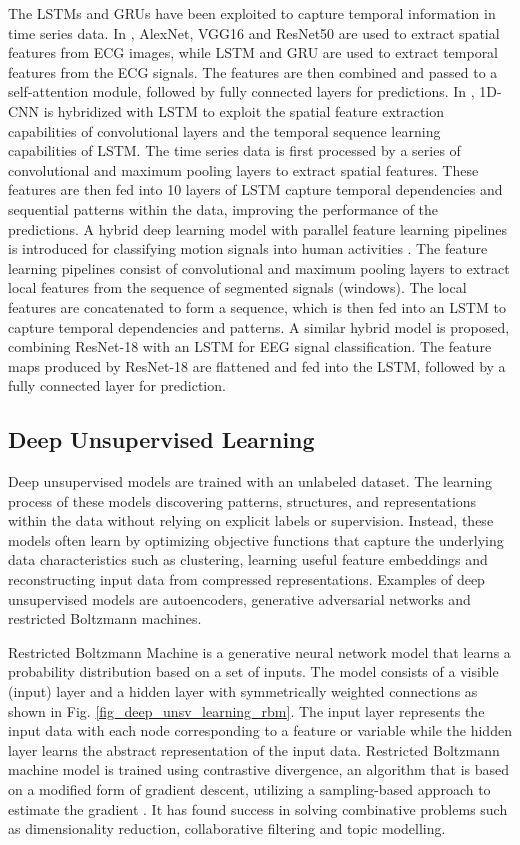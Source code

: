 \documentclass[preprint,12pt]{elsarticle}
\begin{document}
The LSTMs and GRUs have been exploited to capture temporal information in time series data. In \citep{narotamo_deep_2024}, AlexNet, VGG16 and ResNet50 are used to extract spatial features from ECG images, while LSTM and GRU are used to extract temporal features from the ECG signals. The features are then combined and passed to a self-attention module, followed by fully connected layers for predictions. In \citep{zhang_heart_2024}, 1D-CNN is hybridized with LSTM to exploit the spatial feature extraction capabilities of convolutional layers and the temporal sequence learning capabilities of LSTM. The time series data is first processed by a series of convolutional and maximum pooling layers to extract spatial features. These features are then fed into 10 layers of LSTM capture temporal dependencies and sequential patterns within the data, improving the performance of the predictions. A hybrid deep learning model with parallel feature learning pipelines is introduced for classifying motion signals into human activities \citep{mohd_noor_deep_2022}. The feature learning pipelines consist of convolutional and maximum pooling layers to extract local features from the sequence of segmented signals (windows). The local features are concatenated to form a sequence, which is then fed into an LSTM to capture temporal dependencies and patterns. A similar hybrid model is proposed, combining ResNet-18 with an LSTM for EEG signal classification. The feature maps produced by ResNet-18 are flattened and fed into the LSTM, followed by a fully connected layer for prediction.

\subsection{Deep Unsupervised Learning}
Deep unsupervised models are trained with an unlabeled dataset. The learning process of these models discovering patterns, structures, and representations within the data without relying on explicit labels or supervision. Instead, these models often learn by optimizing objective functions that capture the underlying data characteristics such as clustering, learning useful feature embeddings and reconstructing input data from compressed representations. Examples of deep unsupervised models are autoencoders, generative adversarial networks and restricted Boltzmann machines.

Restricted Boltzmann Machine is a generative neural network model that learns a probability distribution based on a set of inputs. The model consists of a visible (input) layer and a hidden layer with symmetrically weighted connections as shown in Fig. \ref{fig_deep_unsv_learning_rbm}. The input layer represents the input data with each node corresponding to a feature or variable while the hidden layer learns the abstract representation of the input data. Restricted Boltzmann machine model is trained using contrastive divergence, an algorithm that is based on a modified form of gradient descent, utilizing a sampling-based approach to estimate the gradient \citep{hinton_practical_2012}. It has found success in solving combinative problems such as dimensionality reduction, collaborative filtering and topic modelling.
\end{document}
